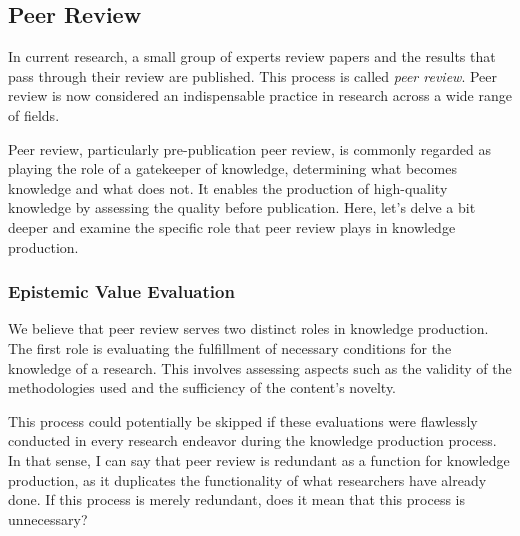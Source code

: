 \documentclass{article}
\begin{document}




\subsection{Peer Review}
In current research, a small group of experts review papers and the results that pass through their review are published. This process is called \textit{peer review}. Peer review is now considered an indispensable practice in research across a wide range of fields.

Peer review, particularly pre-publication peer review, is commonly regarded as playing the role of a gatekeeper of knowledge, determining what becomes knowledge and what does not. It enables the production of high-quality knowledge by assessing the quality before publication. Here, let's delve a bit deeper and examine the specific role that peer review plays in knowledge production.

\subsubsection{Epistemic Value Evaluation}

We believe that peer review serves two distinct roles in knowledge production. The first role is evaluating the fulfillment of necessary conditions for the knowledge of a research. This involves assessing aspects such as the validity of the methodologies used and the sufficiency of the content's novelty. 

This process could potentially be skipped if these evaluations were flawlessly conducted in every research endeavor during the knowledge production process. In that sense, I can say that peer review is redundant as a function for knowledge production, as it duplicates the functionality of what researchers have already done. If this process is merely redundant, does it mean that this process is unnecessary?
\end{document}
